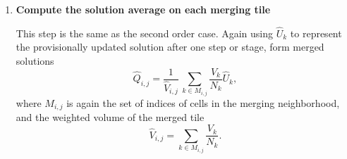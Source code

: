 \begin{enumerate}
\item 
\textbf{Compute the solution average on each merging tile}

This step is the same as the second order case.
Again using $\hat{U}_k$ to represent the provisionally updated 
solution after one step or stage, form merged solutions 
\begin{equation}\label{eq:q_avg1}
     \widehat{Q}_{i,j} =  \frac{1}{ \hat{V}_{i,j}} \,  \sum_{k \in M_{i,j} }\frac{V_{k}}{N_{k}} \hat{U}_{k},
\end{equation}
\noindent where $M_{i,j}$ is again the set of indices of cells in the 
merging neighborhood, and the weighted volume of the merged tile 
\begin{equation}\label{eq:modV}
\hat{V}_{i,j} = \sum_{k \in M_{i,j} }\frac{V_{k}}{N_{k}} .
\end{equation}


\end{enumerate}

